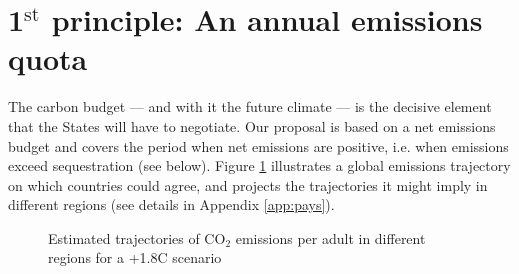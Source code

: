 \documentclass[a5paper,english,openany]{memoir}
\begin{document}
\section{1$^\text{st}$ principle: An annual emissions quota}\label{sec:pcp_quota}

The carbon budget --- and with it the future climate --- is the decisive element that the States will have to negotiate. 
Our proposal is based on a net emissions budget and covers the period when net emissions are positive, i.e. when emissions exceed sequestration (see below). Figure \ref{fig:emissions_par_region} illustrates a global emissions trajectory on which countries could agree, and projects the trajectories it might imply in different regions (see details in Appendix \ref{app:pays}). 

\begin{figure}[h!]
  \caption[Emissions trajectories by region]{Estimated trajectories of CO$_\text{2}$ emissions per adult in different regions for a +1.8\textdegree{}C scenario}\label{fig:emissions_par_region}
\end{figure}
\end{document}
